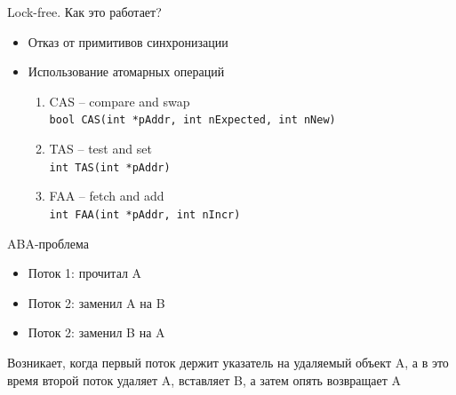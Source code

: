 \documentclass[14pt]{beamer}
\begin{document}
	\begin{frame}{Lock-free. Как это работает?}
		\begin{itemize}
			\item Отказ от примитивов синхронизации
			\item Использование атомарных операций
			\begin{enumerate}
				\item CAS -- compare and swap\\
				\texttt{bool CAS(int *pAddr, int nExpected, int nNew)}
				\item TAS -- test and set\\
				\texttt{int TAS(int *pAddr)}
				\item FAA -- fetch and add\\
				\texttt{int FAA(int *pAddr, int nIncr)}
			\end{enumerate}
		\end{itemize}
	\end{frame}

	\begin{frame}{ABA-проблема}
		\begin{itemize}
			\item Поток 1: прочитал A
			\item Поток 2: заменил A на B
			\item Поток 2: заменил B на A
		\end{itemize}
		Возникает, когда первый поток держит указатель на удаляемый объект A, а в это время второй поток удаляет A, вставляет B, а затем опять возвращает A
	\end{frame}
\end{document}
